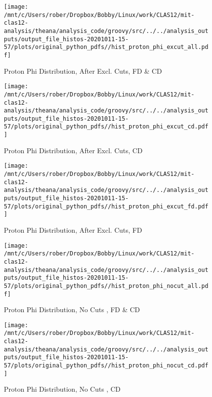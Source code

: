 \documentclass{article}
\begin{document}
\begin{landscape}
    \begin{figure}[h]
        \centering

        \texttt{[image: /mnt/c/Users/rober/Dropbox/Bobby/Linux/work/CLAS12/mit-clas12-analysis/theana/analysis\_code/groovy/src/../../analysis\_outputs/output\_file\_histos-20201011-15-57/plots/original\_python\_pdfs//hist\_proton\_phi\_excut\_all.pdf]}
        \captionsetup{textformat=empty,labelformat=blank}
        \caption{Proton Phi Distribution, After Excl. Cuts, FD \& CD}
    \end{figure}
    \clearpage
    
    \begin{figure}[h]
        \centering

        \texttt{[image: /mnt/c/Users/rober/Dropbox/Bobby/Linux/work/CLAS12/mit-clas12-analysis/theana/analysis\_code/groovy/src/../../analysis\_outputs/output\_file\_histos-20201011-15-57/plots/original\_python\_pdfs//hist\_proton\_phi\_excut\_cd.pdf]}
        \captionsetup{textformat=empty,labelformat=blank}
        \caption{Proton Phi Distribution, After Excl. Cuts, CD}
    \end{figure}
    \clearpage
    
    \begin{figure}[h]
        \centering

        \texttt{[image: /mnt/c/Users/rober/Dropbox/Bobby/Linux/work/CLAS12/mit-clas12-analysis/theana/analysis\_code/groovy/src/../../analysis\_outputs/output\_file\_histos-20201011-15-57/plots/original\_python\_pdfs//hist\_proton\_phi\_excut\_fd.pdf]}
        \captionsetup{textformat=empty,labelformat=blank}
        \caption{Proton Phi Distribution, After Excl. Cuts, FD}
    \end{figure}
    \clearpage
    
    \begin{figure}[h]
        \centering

        \texttt{[image: /mnt/c/Users/rober/Dropbox/Bobby/Linux/work/CLAS12/mit-clas12-analysis/theana/analysis\_code/groovy/src/../../analysis\_outputs/output\_file\_histos-20201011-15-57/plots/original\_python\_pdfs//hist\_proton\_phi\_nocut\_all.pdf]}
        \captionsetup{textformat=empty,labelformat=blank}
        \caption{Proton Phi Distribution, No Cuts , FD \& CD}
    \end{figure}
    \clearpage
    
    \begin{figure}[h]
        \centering

        \texttt{[image: /mnt/c/Users/rober/Dropbox/Bobby/Linux/work/CLAS12/mit-clas12-analysis/theana/analysis\_code/groovy/src/../../analysis\_outputs/output\_file\_histos-20201011-15-57/plots/original\_python\_pdfs//hist\_proton\_phi\_nocut\_cd.pdf]}
        \captionsetup{textformat=empty,labelformat=blank}
        \caption{Proton Phi Distribution, No Cuts , CD}
    \end{figure}
    \clearpage
    

\end{landscape}
\end{document}
